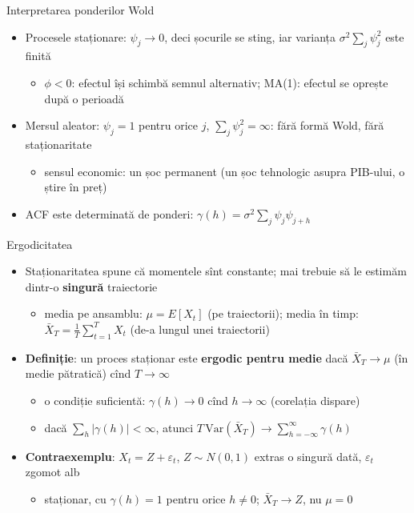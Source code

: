 \begin{frame}{Interpretarea ponderilor Wold}
\itemsize{\small}
\begin{itemize}
    \item Procesele staționare: $\psi_j \to 0$, deci șocurile se sting, iar varianța $\sigma^2\sum_j\psi_j^2$ este finită
    \begin{itemize}
        \item $\phi < 0$: efectul își schimbă semnul alternativ; MA(1): efectul se oprește după o perioadă
    \end{itemize}
    \item Mersul aleator: $\psi_j = 1$ pentru orice $j$, $\sum_j\psi_j^2 = \infty$: fără formă Wold, fără staționaritate
    \begin{itemize}
        \item sensul economic: un șoc permanent (un șoc tehnologic asupra PIB-ului, o știre în preț)
    \end{itemize}
    \item ACF este determinată de ponderi: $\gamma(h) = \sigma^2\sum_j\psi_j\psi_{j+h}$
\end{itemize}
\end{frame}

\begin{frame}{Ergodicitatea}
\itemsize{\small}
\begin{itemize}
    \item Staționaritatea spune că momentele sînt constante; mai trebuie să le estimăm dintr-o \textbf{singură} traiectorie
    \begin{itemize}
        \item media pe ansamblu: $\mu = E[X_t]$ (pe traiectorii); media în timp: $\bar X_T = \frac1T\sum_{t=1}^{T}X_t$ (de-a lungul unei traiectorii)
    \end{itemize}
    \item \textbf{Definiție}: un proces staționar este \textbf{ergodic pentru medie} dacă $\bar X_T \to \mu$ (în medie pătratică) cînd $T \to \infty$
    \begin{itemize}
        \item o condiție suficientă: $\gamma(h) \to 0$ cînd $h \to \infty$ (corelația dispare)
        \item dacă $\sum_h|\gamma(h)| < \infty$, atunci $T\,\mathrm{Var}(\bar X_T) \to \sum_{h=-\infty}^{\infty}\gamma(h)$
    \end{itemize}
    \item \textbf{Contraexemplu}: $X_t = Z + \varepsilon_t$, $Z \sim N(0, 1)$ extras o singură dată, $\varepsilon_t$ zgomot alb
    \begin{itemize}
        \item staționar, cu $\gamma(h) = 1$ pentru orice $h \ne 0$; $\bar X_T \to Z$, nu $\mu = 0$
    \end{itemize}
\end{itemize}
\end{frame}

